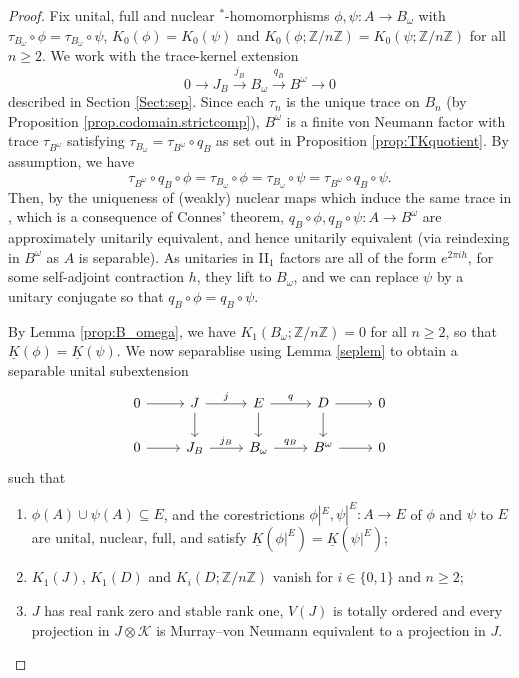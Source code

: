 \documentclass[reqno]{amsart}
\theoremstyle{definition}
\theoremstyle{remark}
\numberwithin{equation}{section}
\theoremstyle{definition}
\begin{document}
\begin{proof} 
Fix unital, full and nuclear $^*$-homomorphisms $\phi,\psi\colon A\to B_\omega$ with $\tau_{B_{\omega}}\circ\phi=\tau_{B_{\omega}}\circ\psi$, $K_{0}(\phi) = K_0(\psi)$ and $K_0(\phi;\mathbb Z/n\mathbb Z)=K_0(\psi;\mathbb Z/n\mathbb Z)$ for all $n\geq 2$. We work with the trace-kernel extension 
\begin{equation} 
0\longrightarrow J_B\stackrel{j_B}{\longrightarrow} B_\omega\stackrel{q_B}{\longrightarrow} B^\omega \longrightarrow 0
\end{equation} 
described in Section \ref{Sect:sep}. Since each $\tau_n$ is the unique trace on $B_n$ (by Proposition \ref{prop.codomain.strictcomp}), $B^\omega$ is a finite von Neumann factor with trace $\tau_{B^\omega}$ satisfying $\tau_{B_\omega}=\tau_{B^\omega}\circ q_B$ as set out in Proposition \ref{prop:TKquotient}. By assumption, we have 
\begin{equation} 
\tau_{B^\omega}\circ q_B\circ\phi=\tau_{B_{\omega}}\circ \phi = \tau_{B_{\omega}}\circ\psi = \tau_{B^\omega}\circ q_B\circ\psi. 
\end{equation} 
Then, by the uniqueness of (weakly) nuclear maps which induce the same trace in \cite[Proposition 1.1]{Schafhauser.Annals}, which is a consequence of Connes' theorem, $q_B\circ\phi,q_B\circ\psi\colon A\to B^\omega$ are approximately unitarily equivalent, and hence unitarily equivalent (via reindexing in $B^\omega$ as $A$ is separable).  As unitaries in II$_1$ factors are all of the form $e^{2\pi ih}$, for some self-adjoint contraction $h$, they lift to $B_\omega$, and we can replace $\psi$ by a unitary conjugate so that $q_B\circ\phi=q_B\circ\psi$.  

By Lemma \ref{prop:B_omega}, we have $K_1(B_\omega;\mathbb Z/n\mathbb Z)=0$ for all $n\geq 2$, so that $\underline{K}(\phi)=\underline{K}(\psi)$. We now separablise using Lemma \ref{seplem} to obtain a separable unital subextension 
\begin{equation}
\begin{tikzcd}
0\arrow[r]&J\arrow[r,"j"]\arrow[d]&E\arrow[r,"q"]\arrow[d]&D\arrow[r]\arrow[d]&0\\
0\arrow[r]&J_B\arrow[r,"j_B"]&B_{\omega}\arrow[r,"q_B"]&B^\omega\arrow[r]&0
\end{tikzcd}
\end{equation} 
such that
\begin{enumerate}
\item \label{condition_sep_full} $\phi(A)\cup \psi(A)\subseteq E$, and the corestrictions $\phi|^E,\psi|^E\colon A\to E$ of $\phi$ and $\psi$ to $E$ are unital, nuclear, full, and satisfy $\underline{K}(\phi|^E)=\underline{K}(\psi|^E)$; 
\item $K_{1}(J)$, $K_{1}(D)$ and $K_{i}(D; \mathbb{Z} / n\mathbb{Z})$ vanish for $i\in \{0,1\}$ and $n\geq 2$; 
\item \label{condition_sep_J}$J$ has real rank zero and stable rank one, $V(J)$ is totally ordered and every projection in $J\otimes\mathcal K$ is Murray--von Neumann equivalent to a projection in $J$. 
\end{enumerate} 



\end{proof}
\end{document}
